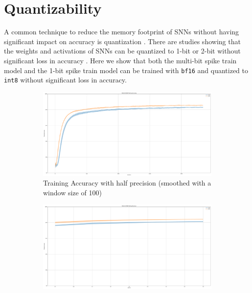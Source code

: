 \section{Quantizability}
\label{sec:quantizability}
    A common technique to reduce the memory footprint of SNNs without having significant impact on accuracy is quantization \cite{9534087}. There are studies showing that the weights and activations of SNNs can be quantized to 1-bit or 2-bit without significant loss in accuracy \cite{10.1145/3664647.3681186}. Here we show that both the multi-bit spike train model and the 1-bit spike train model can be trained with \verb|bf16| and quantized to \verb|int8| without significant loss in accuracy.
    \begin{figure}[!htpb]
        \centering
        \begin{subfigure}[H]{0.48\textwidth}
            \centering
            \includegraphics[width=\textwidth]{../quantized/FashionMNIST/plots/fashionmnist_train_acc.pdf}
            \caption{Training Accuracy with half precision (smoothed with a window size of 100)}
        \end{subfigure}
        \hfill
        \begin{subfigure}[H]{0.48\textwidth}
            \centering
            \includegraphics[width=\textwidth]{../bf16/FashionMNIST/plots/fashionmnist_test_acc.pdf}

\end{subfigure}
\end{figure}
